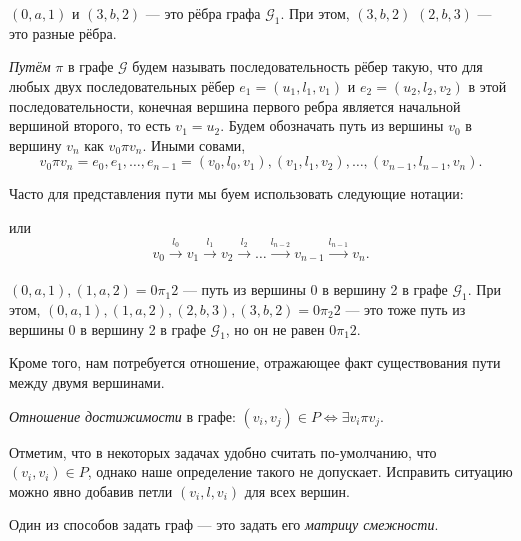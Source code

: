 \begin{example}
$(0,a,1)$  и $(3,b,2)$ --- это рёбра графа $\mathcal{G}_1$. При этом, $(3,b,2)$ $(2,b,3)$ --- это разные рёбра.
\end{example}

\begin{definition}
  \textit{Путём} $\pi$ в графе $\mathcal{G}$ будем называть последовательность рёбер такую, что для любых двух последовательных рёбер $e_1=(u_1,l_1,v_1)$ и $e_2=(u_2,l_2,v_2)$ в этой последовательности, конечная вершина первого ребра является начальной вершиной второго, то есть $v_1 = u_2$. Будем обозначать путь из вершины $v_0$ в вершину $v_n$ как $v_0 \pi v_n$. Иными совами, $$v_0 \pi v_n = e_0,e_1, \dots, e_{n-1} = (v_0, l_0, v_1),(v_1,l_1,v_2),\dots,(v_{n-1},l_{n-1},v_n).$$

  Часто для представления пути мы буем использовать следующие нотации:
\begin{center}
  
\end{center}
\end{definition}
 или  
$$
v_0 \xrightarrow[]{l_0} v_1 \xrightarrow[]{l_1} v_2 \xrightarrow[]{l_2} \ldots \xrightarrow[]{l_{n-2}} v_{n-1} \xrightarrow[]{l_{n-1}} v_n.
$$

\begin{example}
$(0,a,1),(1,a,2) = 0\pi_1 2$  --- путь из вершины 0 в вершину 2 в графе $\mathcal{G}_1$.
При этом, $(0,a,1),(1,a,2),(2,b,3),(3,b,2) = 0\pi_2 2$ --- это тоже путь из вершины 0 в вершину 2 в графе $\mathcal{G}_1$, но он не равен $0\pi_1 2$.
\end{example}

Кроме того, нам потребуется отношение, отражающее факт существования пути между двумя вершинами.

\begin{definition}\label{def:reach}
  \textit{Отношение достижимости} в графе:
  $(v_i,v_j) \in P \iff \exists v_i \pi v_j$.
\end{definition}

Отметим, что в некоторых задачах удобно считать по-умолчанию, что $(v_i,v_i) \in P$, однако наше определение такого не допускает. Исправить ситуацию можно явно добавив петли $(v_i,l,v_i)$ для всех вершин.

Один из способов задать граф --- это задать его \textit{матрицу смежности}.

